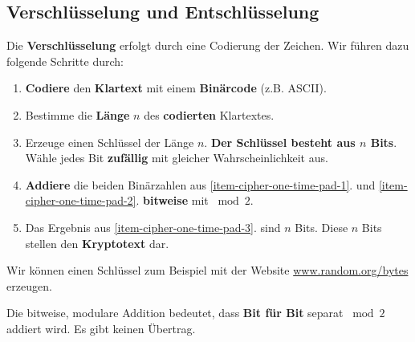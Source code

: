 \subsection{Verschlüsselung und Entschlüsselung}

Die \textbf{Verschlüsselung} erfolgt durch eine Codierung der Zeichen. Wir führen dazu folgende Schritte durch:

\begin{enumerate}
	\item \label{item-cipher-one-time-pad-1} \textbf{Codiere} den \textbf{Klartext} mit einem \textbf{Binärcode} (z.B. \ac{ASCII}).
	\item Bestimme die \textbf{Länge} $n$ des \textbf{codierten} Klartextes.
	\item \label{item-cipher-one-time-pad-2} Erzeuge einen Schlüssel der Länge $n$. \textbf{Der Schlüssel besteht aus $n$ Bits}. Wähle jedes Bit \textbf{zufällig} mit gleicher Wahrscheinlichkeit aus.
	
	\item \label{item-cipher-one-time-pad-3} \textbf{Addiere} die beiden Binärzahlen aus \ref{item-cipher-one-time-pad-1}. und \ref{item-cipher-one-time-pad-2}. \textbf{bitweise} mit $\bmod 2$.
	\item Das Ergebnis aus \ref{item-cipher-one-time-pad-3}. sind $n$ Bits. Diese $n$ Bits stellen den \textbf{Kryptotext} dar.
\end{enumerate}

Wir können einen Schlüssel zum Beispiel mit der Website \url{www.random.org/bytes} erzeugen.

\begin{important}
Die bitweise, modulare Addition bedeutet, dass \textbf{Bit für Bit} separat $\bmod 2$ addiert wird. Es gibt keinen Übertrag.
\end{important}

